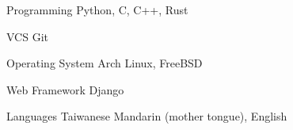 

\begin{cvskills}

  \cvskill
    {Programming} %
    {Python, C, C++, Rust} %

  \cvskill
    {VCS} %
    {Git} %

  \cvskill
    {Operating System} %
    {Arch Linux, FreeBSD} %

  \cvskill
    {Web Framework} %
    {Django} %

  \cvskill
    {Languages} %
    {Taiwanese Mandarin (mother tongue), English} %


\end{cvskills}
